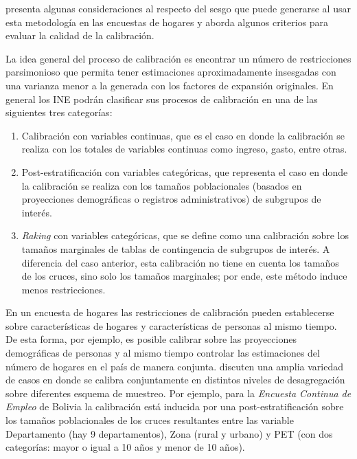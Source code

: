 \documentclass[12pt,spanish,]{book}
\providecommand{\tightlist}{%
  \setlength{\itemsep}{0pt}\setlength{\parskip}{0pt}}
\begin{document}
\textcite{Silva_2004} presenta algunas consideraciones al respecto del sesgo que puede generarse al usar esta metodología en las encuestas de hogares y aborda algunos criterios para evaluar la calidad de la calibración.

La idea general del proceso de calibración es encontrar un número de restricciones parsimonioso que permita tener estimaciones aproximadamente insesgadas con una varianza menor a la generada con los factores de expansión originales. En general los INE podrán clasificar sus procesos de calibración en una de las siguientes tres categorías:

\begin{enumerate}
\def\labelenumi{\arabic{enumi}.}
\tightlist
\item
  Calibración con variables continuas, que es el caso en donde la calibración se realiza con los totales de variables continuas como ingreso, gasto, entre otras.
\item
  Post-estratificación con variables categóricas, que representa el caso en donde la calibración se realiza con los tamaños poblacionales (basados en proyecciones demográficas o registros administrativos) de subgrupos de interés.
\item
  \emph{Raking} con variables categóricas, que se define como una calibración sobre los tamaños marginales de tablas de contingencia de subgrupos de interés. A diferencia del caso anterior, esta calibración no tiene en cuenta los tamaños de los cruces, sino solo los tamaños marginales; por ende, este método induce menos restricciones.
\end{enumerate}

En un encuesta de hogares las restricciones de calibración pueden establecerse sobre características de hogares y características de personas al mismo tiempo. De esta forma, por ejemplo, es posible calibrar sobre las proyecciones demográficas de personas y al mismo tiempo controlar las estimaciones del número de hogares en el país de manera conjunta. \textcite{Estevao_Sarndal_2006} discuten una amplia variedad de casos en donde se calibra conjuntamente en distintos niveles de desagregación sobre diferentes esquema de muestreo. Por ejemplo, para la \emph{Encuesta Continua de Empleo} de Bolivia la calibración está inducida por una post-estratificación sobre los tamaños poblacionales de los cruces resultantes entre las variable Departamento (hay 9 departamentos), Zona (rural y urbano) y PET (con dos categorías: mayor o igual a 10 años y menor de 10 años).
\end{document}
